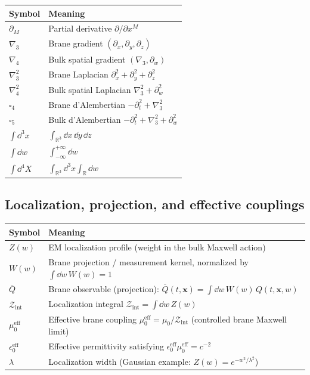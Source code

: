 \documentclass[11pt]{article}
\begin{document}
\begin{center}
\begin{tabular}{@{}ll@{}}
\toprule
Symbol & Meaning \\
\midrule
$\partial_M$ & Partial derivative $\partial/\partial x^M$ \\
$\nabla_3$ & Brane gradient $(\partial_x,\partial_y,\partial_z)$ \\
$\nabla_4$ & Bulk spatial gradient $(\nabla_3,\partial_w)$ \\
$\nabla_3^2$ & Brane Laplacian $\partial_x^2+\partial_y^2+\partial_z^2$ \\
$\nabla_4^2$ & Bulk spatial Laplacian $\nabla_3^2+\partial_w^2$ \\
$\square_4$ & Brane d'Alembertian $-\partial_t^2+\nabla_3^2$ \\
$\square_5$ & Bulk d'Alembertian $-\partial_t^2+\nabla_3^2+\partial_w^2$ \\
$\int \dd^3x$ & $\int_{\mathbb{R}^3}\dd x\,\dd y\,\dd z$ \\
$\int \dd w$ & $\int_{-\infty}^{+\infty}\dd w$ \\
$\int \dd^4X$ & $\int_{\mathbb{R}^3}\dd^3x\int_{\mathbb{R}}\dd w$ \\
\bottomrule
\end{tabular}
\end{center}

\subsection*{Localization, projection, and effective couplings}

\begin{center}
\begin{tabular}{@{}ll@{}}
\toprule
Symbol & Meaning \\
\midrule
$Z(w)$ & EM localization profile (weight in the bulk Maxwell action) \\
$W(w)$ & Brane projection / measurement kernel, normalized by $\int \dd w\,W(w)=1$ \\
$\overline{Q}$ & Brane observable (projection): $\overline{Q}(t,\mathbf{x})=\int \dd w\,W(w)\,Q(t,\mathbf{x},w)$ \\
$\mathcal{Z}_{\mathrm{int}}$ & Localization integral $\mathcal{Z}_{\mathrm{int}}=\int \dd w\,Z(w)$ \\
$\mu_0^{\mathrm{eff}}$ & Effective brane coupling $\mu_0^{\mathrm{eff}}=\mu_0/\mathcal{Z}_{\mathrm{int}}$ (controlled brane Maxwell limit) \\
$\epsilon_0^{\mathrm{eff}}$ & Effective permittivity satisfying $\epsilon_0^{\mathrm{eff}}\mu_0^{\mathrm{eff}}=c^{-2}$ \\
$\lambda$ & Localization width (Gaussian example: $Z(w)=e^{-w^2/\lambda^2}$) \\
\bottomrule
\end{tabular}
\end{center}
\end{document}
